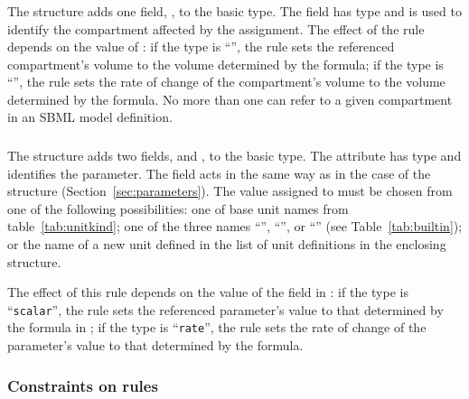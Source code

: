\documentclass[10pt]{cekarticle}
\newcommand{\changed}[1]{\textcolor{BrickRed}{#1}}
\begin{document}
\subsubsection{}

The  structure adds one field, ,
to the basic  type.  The field 
has type  and is used to identify the compartment affected by
the assignment.  The effect of the rule depends on the value of
: if the type is ``'', the rule sets the
referenced compartment's volume to the volume determined by the formula; if
the type is ``'', the rule sets the rate of change of the
compartment's volume to the volume determined by the formula.
\changed{No more than one  can refer to a
given compartment in an SBML model definition.}


\subsubsection{}
\label{sec:parameterrule}

The  structure adds two fields,  and
, to the basic  type.  The
 attribute has type  and identifies the
parameter.  The  field acts in the same way as in the case of
the  structure (Section~\ref{sec:parameters}).  The value
assigned to  must be chosen from one of the following
possibilities: one of base unit names from table~\ref{tab:unitkind}; one of
the three names ``'', ``'', or
``'' (see Table~\ref{tab:builtin}); or the name of a new
unit defined in the list of unit definitions in the enclosing 
structure.  

The effect of this rule depends on the value of the  field in
: if the type is ``\texttt{scalar}'', the rule sets
the referenced parameter's value to that determined by the formula in
; if the type is ``\texttt{rate}'', the rule sets the rate of
change of the parameter's value to that determined by the formula.


\subsubsection{Constraints on rules}
\label{sec:ruleconstraints}
\end{document}
